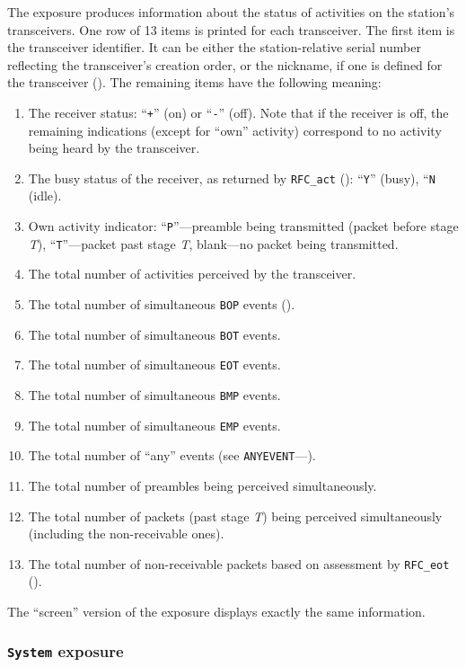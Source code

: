 The exposure produces information about the status of activities on
the station's transceivers.
One row of 13 items is printed for each transceiver.
The first item is the transceiver identifier.
It can be either the station-relative serial number reflecting the
transceiver's creation order, or the nickname, if one is defined for the
transceiver ().
The remaining items have the following meaning:

\begin{enumerate}
\item
The receiver status: ``{\tt +}'' (on) or ``{\tt -}'' (off).
Note that if the receiver is off, the remaining indications (except for
``own'' activity) correspond to no activity being heard by the transceiver.
\item
The busy status of the receiver, as returned by {\tt RFC\_act}
(): ``{\tt Y}'' (busy), ``{\tt N} (idle).
\item
Own activity indicator: ``{\tt P}''---preamble being transmitted
(packet before stage {\em T\/}), ``{\tt T}''---packet past stage {\em T},
blank---no packet being transmitted.
\item
The total number of activities perceived by the transceiver.
\item
The total number of simultaneous {\tt BOP} events ().
\item
The total number of simultaneous {\tt BOT} events.
\item
The total number of simultaneous {\tt EOT} events.
\item
The total number of simultaneous {\tt BMP} events.
\item
The total number of simultaneous {\tt EMP} events.
\item
The total number of ``any'' events (see {\tt ANYEVENT}---).
\item
The total number of preambles being perceived simultaneously.
\item
The total number of packets (past stage {\em T\/}) being perceived
simultaneously (including the non-receivable ones).
\item
The total number of non-receivable packets
based on assessment by {\tt RFC\_eot} ().
\end{enumerate}

The ``screen'' version of the exposure displays exactly
the same information.

\subsubsection{{\tt System} exposure}
\label{rm_ex_se_sy}

